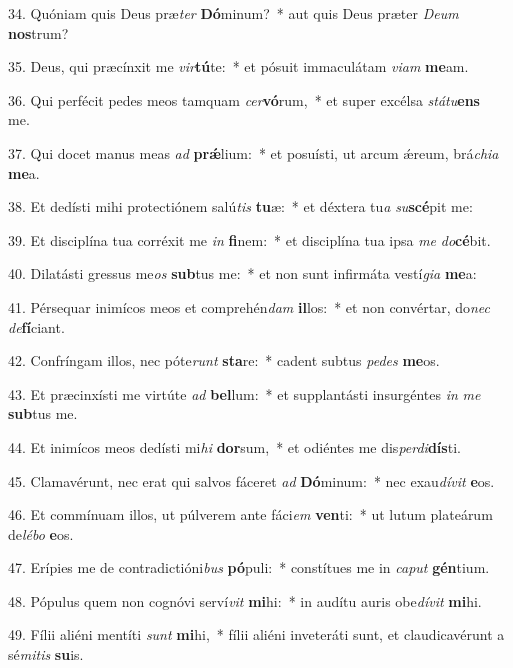 34. Quóniam quis Deus præ\textit{ter} \textbf{Dó}minum?~*  aut quis Deus præter \textit{De}\textit{um} \textbf{nos}trum?\

35. Deus, qui præcínxit me \textit{vir}\textbf{tú}te:~*  et pósuit immaculátam \textit{vi}\textit{am} \textbf{me}am.\

36. Qui perfécit pedes meos tamquam \textit{cer}\textbf{vó}rum,~*  et super excélsa \textit{stá}\textit{tu}\textbf{ens} me.\

37. Qui docet manus meas \textit{ad} \textbf{prǽ}lium:~*  et posuísti, ut arcum ǽreum, brá\textit{chi}\textit{a} \textbf{me}a.\

38. Et dedísti mihi protectiónem salú\textit{tis} \textbf{tu}æ:~*  et déxtera tu\textit{a} \textit{su}\textbf{scé}pit me:\

39. Et disciplína tua corréxit me \textit{in} \textbf{fi}nem:~*  et disciplína tua ipsa \textit{me} \textit{do}\textbf{cé}bit.\

40. Dilatásti gressus me\textit{os} \textbf{sub}tus me:~*  et non sunt infirmáta vestí\textit{gi}\textit{a} \textbf{me}a:\

41. Pérsequar inimícos meos et comprehén\textit{dam} \textbf{il}los:~*  et non convértar, do\textit{nec} \textit{de}\textbf{fí}ciant.\

42. Confríngam illos, nec póte\textit{runt} \textbf{sta}re:~*  cadent subtus \textit{pe}\textit{des} \textbf{me}os.\

43. Et præcinxísti me virtúte \textit{ad} \textbf{bel}lum:~*  et supplantásti insurgéntes \textit{in} \textit{me} \textbf{sub}tus me.\

44. Et inimícos meos dedísti mi\textit{hi} \textbf{dor}sum,~*  et odiéntes me dis\textit{per}\textit{di}\textbf{dís}ti.\

45. Clamavérunt, nec erat qui salvos fáceret \textit{ad} \textbf{Dó}minum:~*  nec exau\textit{dí}\textit{vit} \textbf{e}os.\

46. Et commínuam illos, ut púlverem ante fáci\textit{em} \textbf{ven}ti:~*  ut lutum plateárum de\textit{lé}\textit{bo} \textbf{e}os.\

47. Erípies me de contradictióni\textit{bus} \textbf{pó}puli:~*  constítues me in \textit{ca}\textit{put} \textbf{gén}tium.\

48. Pópulus quem non cognóvi serví\textit{vit} \textbf{mi}hi:~*  in audítu auris obe\textit{dí}\textit{vit} \textbf{mi}hi.\

49. Fílii aliéni mentíti \textit{sunt} \textbf{mi}hi,~*  fílii aliéni inveteráti sunt, et claudicavérunt a sé\textit{mi}\textit{tis} \textbf{su}is.\

